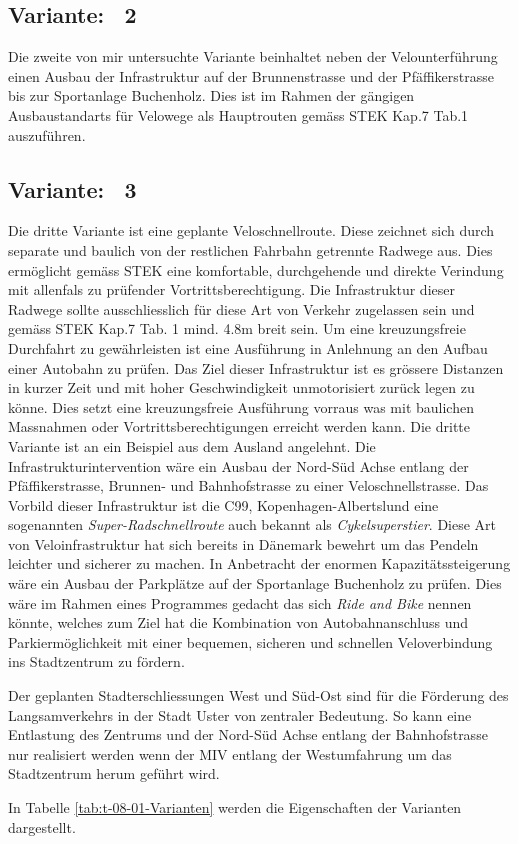\subsection{Variante: \ 2}
\label{subsec:V2}
	
Die zweite von mir untersuchte Variante beinhaltet neben der Velounterführung einen Ausbau der Infrastruktur auf der Brunnenstrasse und der Pfäffikerstrasse bis zur Sportanlage Buchenholz. Dies ist im Rahmen der gängigen Ausbaustandarts für Velowege als Hauptrouten gemäss STEK Kap.7 Tab.1 auszuführen.

\subsection{Variante: \ 3}
\label{subsec:V3}

Die dritte Variante ist eine geplante Veloschnellroute. 
Diese zeichnet sich durch separate und baulich von der restlichen Fahrbahn getrennte Radwege aus. Dies ermöglicht gemäss STEK eine komfortable, durchgehende und direkte Verindung mit allenfals zu prüfender Vortrittsberechtigung. Die Infrastruktur dieser Radwege sollte ausschliesslich für diese Art von Verkehr zugelassen sein und gemäss STEK Kap.7 Tab. 1 mind. 4.8m breit sein. Um eine kreuzungsfreie Durchfahrt zu gewährleisten ist eine Ausführung in Anlehnung an den Aufbau einer Autobahn zu prüfen.  
Das Ziel dieser Infrastruktur ist es grössere Distanzen in kurzer Zeit und mit hoher Geschwindigkeit unmotorisiert zurück legen zu könne. Dies setzt eine kreuzungsfreie Ausführung vorraus was mit baulichen Massnahmen oder Vortrittsberechtigungen erreicht werden kann.
Die dritte Variante ist an ein Beispiel aus dem Ausland angelehnt. Die Infrastrukturintervention wäre ein Ausbau der Nord-Süd Achse entlang der Pfäffikerstrasse, Brunnen- und Bahnhofstrasse zu einer Veloschnellstrasse. 
Das Vorbild dieser Infrastruktur ist die C99, Kopenhagen-Albertslund eine sogenannten \textit{Super-Radschnellroute} auch bekannt als \textit{Cykelsuperstier}. Diese Art von Veloinfrastruktur hat sich bereits in Dänemark bewehrt um das Pendeln leichter und sicherer zu machen. 
In Anbetracht der enormen Kapazitätssteigerung wäre ein Ausbau der Parkplätze auf der Sportanlage Buchenholz zu prüfen. Dies wäre im Rahmen eines Programmes gedacht das sich \textit{Ride and Bike} nennen könnte, welches zum Ziel hat die Kombination von Autobahnanschluss und Parkiermöglichkeit mit einer bequemen, sicheren und schnellen Veloverbindung ins Stadtzentrum zu fördern. 

Der geplanten Stadterschliessungen West und Süd-Ost sind für die Förderung des Langsamverkehrs in der Stadt Uster von zentraler Bedeutung. So kann eine Entlastung des Zentrums und der Nord-Süd Achse entlang der Bahnhofstrasse nur realisiert werden wenn der MIV entlang der Westumfahrung um das Stadtzentrum herum geführt wird. 

In Tabelle \ref{tab:t-08-01-Varianten} werden die Eigenschaften der Varianten dargestellt.




%

